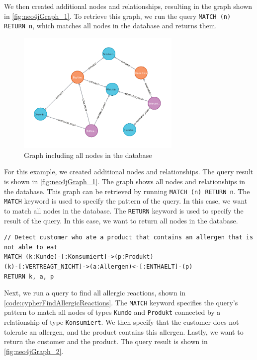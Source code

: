 We then created additional nodes and relationships, resulting in the graph shown in \autoref{fig:neo4jGraph_1}. To retrieve this graph, we run the query \texttt{MATCH (n) RETURN n}, which matches all nodes in the database and returns them.

\begin{figure}[H]
    \centering
    \caption{Graph including all nodes in the database} \label{fig:neo4jGraph_1}
    \includegraphics[width=0.7\textwidth]{images/neo4j_example_graph_1.png}
\end{figure}

For this example, we created additional nodes and relationships. The query result is shown in \autoref{fig:neo4jGraph_1}. The graph shows all nodes and relationships in the database. This graph can be retrieved by running \texttt{MATCH (n) RETURN n}. The \texttt{MATCH} keyword is used to specify the pattern of the query. In this case, we want to match all nodes in the database. The \texttt{RETURN} keyword is used to specify the result of the query. In this case, we want to return all nodes in the database.

\begin{code}[H]
    \caption{Cypher Query to select allergic reactions} \label{code:cypherFindAllergicReactions}
    \begin{verbatim}
// Detect customer who ate a product that contains an allergen that is not able to eat
MATCH (k:Kunde)-[:Konsumiert]->(p:Produkt)
(k)-[:VERTREAGT_NICHT]->(a:Allergen)<-[:ENTHAELT]-(p)
RETURN k, a, p
    \end{verbatim}
\end{code}

Next, we run a query to find all allergic reactions, shown in \autoref{code:cypherFindAllergicReactions}. The \texttt{MATCH} keyword specifies the query's pattern to match all nodes of types \texttt{Kunde} and \texttt{Produkt} connected by a relationship of type \texttt{Konsumiert}. We then specify that the customer does not tolerate an allergen, and the product contains this allergen. Lastly, we want to return the customer and the product. The query result is shown in \autoref{fig:neo4jGraph_2}.

